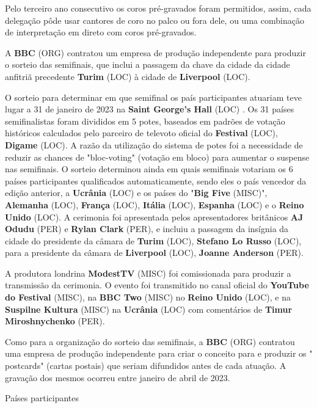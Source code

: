 \documentclass[12pt,a4paper]{article}
\begin{document}
Pelo terceiro ano consecutivo os coros pré-gravados foram permitidos, assim, cada delegação pôde usar cantores de coro no palco ou fora dele, ou uma combinação de interpretação em direto com coros pré-gravados.

A \textbf{BBC} (ORG) contratou um empresa de produção independente para produzir o sorteio das semifinais, que inclui a passagem da chave da cidade da cidade anfitriã precedente \textbf{Turim} (LOC) à cidade de \textbf{Liverpool} (LOC).

O sorteio para determinar em que semifinal os país participantes atuariam teve lugar a 31 de janeiro de 2023 na \textbf{Saint George's Hall} (LOC) . Os 31 países semifinalistas foram divididos em 5 potes, baseados em padrões de votação históricos calculados pelo parceiro de televoto oficial do \textbf{Festival} (LOC), \textbf{Digame} (LOC). A razão da utilização do sistema de potes foi a necessidade de reduzir as chances de "bloc-voting" (votação em bloco) para aumentar o suspense nas semifinais. O sorteio determinou ainda em quais semifinais votariam os 6 países participantes qualificados automaticamente, sendo eles o país vencedor da edição anterior, a \textbf{Ucrânia} (LOC) e os países do "\textbf{Big Five} (MISC)", \textbf{Alemanha} (LOC), \textbf{França} (LOC), \textbf{Itália} (LOC), \textbf{Espanha} (LOC) e o \textbf{Reino Unido} (LOC). A cerimonia foi apresentada pelos apresentadores britânicos \textbf{AJ Odudu} (PER) e \textbf{Rylan Clark} (PER), e incluiu a passagem da insígnia da cidade do presidente da câmara de \textbf{Turim} (LOC), \textbf{Stefano Lo Russo} (LOC), para a presidente da câmara de \textbf{Liverpool} (LOC), \textbf{Joanne Anderson} (PER).

A produtora londrina \textbf{ModestTV} (MISC) foi comissionada para produzir a transmissão da cerimonia. O evento foi transmitido no canal oficial do \textbf{YouTube do Festival} (MISC), na \textbf{BBC Two} (MISC) no \textbf{Reino Unido} (LOC), e na \textbf{Suspilne Kultura} (MISC) na \textbf{Ucrânia} (LOC) com comentários de \textbf{Timur Miroshnychenko} (PER).

Como para a organização do sorteio das semifinais, a \textbf{BBC} (ORG) contratou uma empresa de produção independente para criar o conceito para e produzir os " postcards" (cartas postais) que seriam difundidos antes de cada atuação. A gravação dos mesmos ocorreu entre janeiro de abril de 2023.



Países participantes
\end{document}
